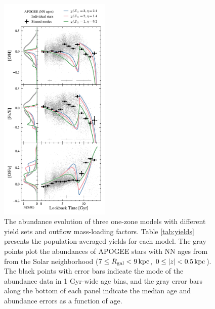 \documentclass[twocolumn,twocolappendix,linenumbers]{aastex631}
\newcommand{\kpc}{\,{\rm kpc}}
\newcommand{\onecolumn}{0.47\textwidth}
\begin{document}
\begin{figure}
    \centering
    \includegraphics[width=\onecolumn]{figures/yield_outflow.pdf}
    \caption{The abundance evolution of three one-zone models with different yield sets and outflow mass-loading factors. Table \ref{tab:yields} presents the population-averaged yields for each model. The gray points plot the abundances of APOGEE stars with NN ages from \citet{leung_variational_2023} from the Solar neighborhood ($7\leq R_{\rm gal}<9\kpc$, $0\leq|z|<0.5\kpc$). The black points with error bars indicate the mode of the abundance data in 1 Gyr-wide age bins, and the gray error bars along the bottom of each panel indicate the median age and abundance errors as a function of age.}
    \label{fig:yield-outflow}
\end{figure}
\end{document}

